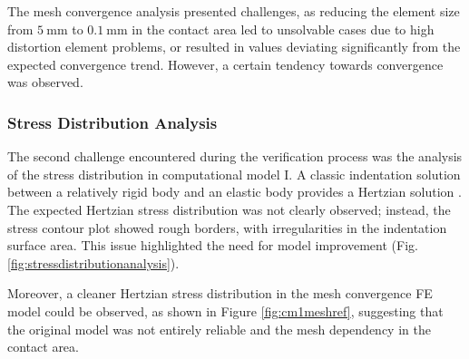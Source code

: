 The mesh convergence analysis presented challenges, as reducing the element size from $\SI{5}{\milli\meter}$ to 
$\SI{0.1}{\milli\meter}$ in the contact area led to unsolvable cases due to high distortion element problems, 
or resulted in values deviating significantly from the expected convergence trend. However, a certain tendency 
towards convergence was observed.

\subsubsection*{Stress Distribution Analysis}
The second challenge encountered during the verification process was the analysis of the stress distribution in 
computational model I. A classic indentation solution between a relatively rigid body and an elastic body provides a Hertzian 
solution \cite{Lin2009}. The expected Hertzian stress distribution was not clearly observed; instead, the stress 
contour plot showed rough borders, with irregularities in the indentation surface area. This issue highlighted
the need for model improvement (Fig. \ref{fig:stressdistributionanalysis}).

Moreover, a cleaner Hertzian stress distribution in the mesh convergence FE model could be observed, as shown in Figure \ref{fig:cm1meshref}, 
suggesting that the original model was not entirely reliable and the mesh dependency in the contact area.

